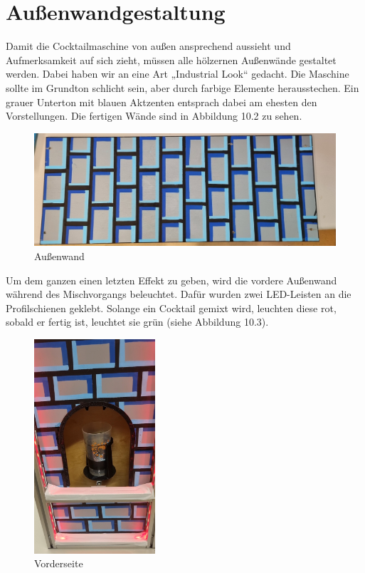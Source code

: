 \documentclass[10pt,a4paper]{report}
\begin{document}
	\section{Außenwandgestaltung}
	Damit die Cocktailmaschine von außen ansprechend aussieht und Aufmerksamkeit auf sich zieht, müssen alle hölzernen Außenwände gestaltet werden. Dabei haben wir an eine Art „Industrial Look“ gedacht. Die Maschine sollte im Grundton schlicht sein, aber durch farbige Elemente herausstechen. Ein grauer Unterton mit blauen Aktzenten entsprach dabei am ehesten den Vorstellungen. Die fertigen Wände sind in Abbildung 10.2 zu sehen.\\
	
	\begin{figure}[htb]
		\includegraphics[width=1\textwidth]{Abb.16_bemalte_Holzwand}
		\centering
		\caption{Außenwand}
	\end{figure}
	
	Um dem ganzen einen letzten Effekt zu geben, wird die vordere Außenwand während des Mischvorgangs beleuchtet. Dafür wurden zwei LED-Leisten an die Profilschienen geklebt. Solange ein Cocktail gemixt wird, leuchten diese rot, sobald er fertig ist, leuchtet sie grün (siehe Abbildung 10.3).\\
	
	\begin{figure}[htb]
		\includegraphics[width=0.4\textwidth]{Abb.17_LED_Beleuchtung}
		\centering
		\caption{Vorderseite}
	\end{figure}	
	
\end{document}
